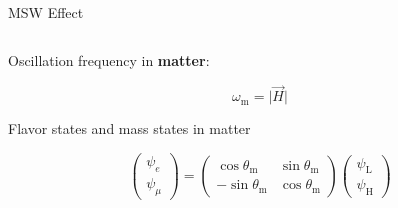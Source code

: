 \documentclass[9pt]{beamer}
\begin{document}
\begin{darkframes}
\begin{frame}{MSW Effect}
{\begin{columns}[T]
\begin{column}{0.5\textwidth}
Oscillation frequency in {\bf matter}:

\begin{equation*}
    \omega_{\mathrm m} = \lvert \vec H \rvert
\end{equation*}

Flavor states and mass states in matter

\begin{equation*}
\begin{pmatrix}
\psi_e\\
\psi_\mu
\end{pmatrix} = \begin{pmatrix}
\cos \theta_{\mathrm m} & \sin\theta_{\mathrm m} \\
-\sin \theta_{\mathrm m} & \cos \theta_{\mathrm m}
\end{pmatrix}\begin{pmatrix}
\psi_{\mathrm L}\\
\psi_{\mathrm H}
\end{pmatrix}
\end{equation*}


\end{column}
\end{columns}


}

\end{frame}
\end{darkframes}
\end{document}
